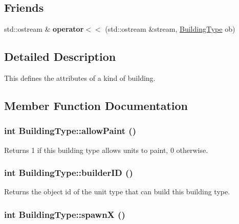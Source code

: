 \subsection*{Friends}
\begin{CompactItemize}
\item 
\hypertarget{classBuildingType_677ea2327738bed33cc14a91c911a4c1}{
std::ostream \& \textbf{operator$<$$<$} (std::ostream \&stream, \hyperlink{classBuildingType}{BuildingType} ob)}
\label{classBuildingType_677ea2327738bed33cc14a91c911a4c1}

\end{CompactItemize}


\subsection{Detailed Description}
This defines the attributes of a kind of building. 

\subsection{Member Function Documentation}
\hypertarget{classBuildingType_dd762a4123302708815b67c11b8029df}{
\subsubsection[{allowPaint}]{\setlength{\rightskip}{0pt plus 5cm}int BuildingType::allowPaint ()}}
\label{classBuildingType_dd762a4123302708815b67c11b8029df}


Returns 1 if this building type allows units to paint, 0 otherwise. \hypertarget{classBuildingType_2345e1ed48eef3ece1fab1a49a5d156c}{
\subsubsection[{builderID}]{\setlength{\rightskip}{0pt plus 5cm}int BuildingType::builderID ()}}
\label{classBuildingType_2345e1ed48eef3ece1fab1a49a5d156c}


Returns the object id of the unit type that can build this building type. \hypertarget{classBuildingType_af7eafec053a2235e0bd59867735cb38}{
\subsubsection[{spawnX}]{\setlength{\rightskip}{0pt plus 5cm}int BuildingType::spawnX ()}}
\label{classBuildingType_af7eafec053a2235e0bd59867735cb38}


